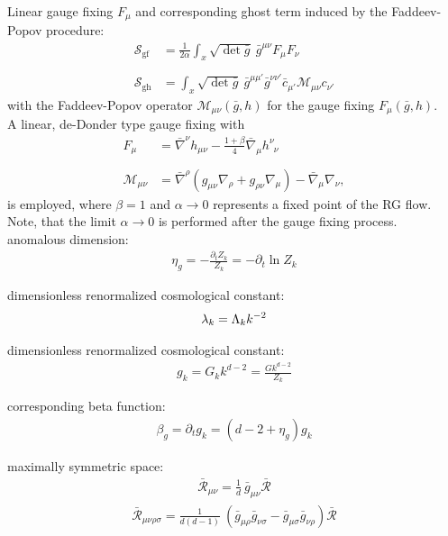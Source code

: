 Linear gauge fixing $F_{\mu}$ and corresponding ghost term induced by the Faddeev-Popov procedure:
\begin{align}
\mathcal{S}_{\text{gf}} &= \frac{1}{2\alpha} \int_x \sqrt{\operatorname{det}\bar{g}} \  \bar{g}^{\mu\nu} F_{\mu}F_{\nu}	\nonumber\\
\phantom{.} \\
\mathcal{S}_{\text{gh}} &= \int_x \sqrt{\operatorname{det}\bar{g}} \  \bar{g}^{\mu\mu'} \bar{g}^{\nu\nu'}\bar{c}_{\mu'} \mathcal{M}_{\mu\nu}  c_{\nu'} \nonumber
\end{align}
with the Faddeev-Popov operator $\mathcal{M}_{\mu\nu}(\bar{g},h)$ for the gauge fixing $F_{\mu}(\bar{g},h)$. \\
A linear, de-Donder type gauge fixing with 
\begin{align}
	F_{\mu} &= \bar{\nabla}^{\nu}h_{\mu\nu} - \frac{1+\beta}{4}\bar{\nabla}_{\mu}h^{\nu}_{\phantom{\nu}\nu} \nonumber \\
	\phantom{.} \\
	\mathcal{M}_{\mu\nu} &= \bar{\nabla}^{\rho}(g_{\mu\nu}\nabla_{\rho} + g_{\rho\nu}\nabla_{\mu}) - \bar{\nabla}_{\mu}\nabla_{\nu}, \nonumber
\end{align}
is employed, where $\beta=1$ and $\alpha\rightarrow 0$ represents a fixed point of the RG flow. Note, that the limit  $\alpha\rightarrow 0$ is performed after the gauge fixing process.  \\

anomalous dimension: 
\begin{align*}
	\eta_g = -\frac{\partial_t Z_k}{Z_k} = -\partial_t \ln Z_k
\end{align*}

dimensionless renormalized cosmological constant:
\begin{align*}
	\lambda_k = \Lambda_k k^{-2}
\end{align*}

dimensionless renormalized cosmological constant:
\begin{align*}
	g_k = G_k k^{d-2} = \frac{Gk^{d-2}}{Z_k}
\end{align*}

corresponding beta function:
\begin{align}
	\beta_g = \partial_t g_k = \left(d-2 + \eta_g\right)g_k
\end{align}

maximally symmetric space:
\begin{align}
	\bar{\mathcal{R}}_{\mu\nu} = \frac{1}{d} \ \bar{g}_{\mu\nu} \bar{\mathcal{R}}
\end{align}
\begin{align}
	\bar{\mathcal{R}}_{\mu\nu\rho\sigma} = \frac{1}{d(d-1)} \ (\bar{g}_{\mu\rho}\bar{g}_{\nu\sigma} - \bar{g}_{\mu\sigma}\bar{g}_{\nu\rho}) \bar{\mathcal{R}}
\end{align}

